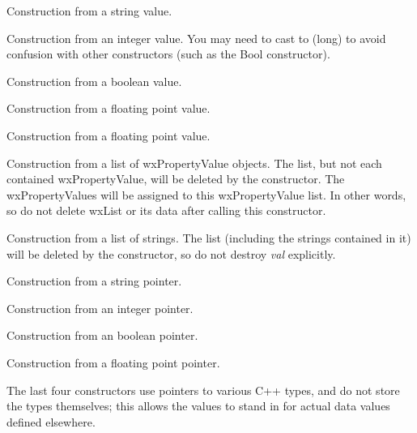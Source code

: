 Construction from a string value.


Construction from an integer value. You may need to cast to (long) to
avoid confusion with other constructors (such as the Bool constructor).


Construction from a boolean value.


Construction from a floating point value.


Construction from a floating point value.


Construction from a list of wxPropertyValue objects. The
list, but not each contained wxPropertyValue, will be deleted
by the constructor. The wxPropertyValues will be assigned to
this wxPropertyValue list. In other words, so do not delete wxList or
its data after calling this constructor.


Construction from a list of strings. The list (including the strings
contained in it) will be deleted by the constructor, so do not
destroy {\it val} explicitly.


Construction from a string pointer.


Construction from an integer pointer.


Construction from an boolean pointer.


Construction from a floating point pointer.

The last four constructors use pointers to various C++ types, and do not
store the types themselves; this allows the values to stand in for actual
data values defined elsewhere.



